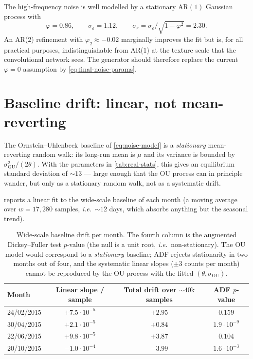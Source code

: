 The high-frequency noise is well modelled by a stationary
$\mathrm{AR}(1)$ Gaussian process with
\begin{equation}
    \varphi = 0.86, \qquad \sigma_\varepsilon = 1.12, \qquad
    \sigma_r = \sigma_\varepsilon / \sqrt{1 - \varphi^2} = 2.30.
    \label{eq:final-noise-params}
\end{equation}
An AR(2) refinement with $\varphi_2 \approx -0.02$ marginally improves
the fit but is, for all practical purposes, indistinguishable from
AR(1) at the texture scale that the convolutional network sees. The
generator should therefore replace the current $\varphi = 0$ assumption
by \cref{eq:final-noise-params}.

\section{Baseline drift: linear, not mean-reverting}
\label{sec:reanal-drift}

The Ornstein--Uhlenbeck baseline of \cref{eq:noise-model} is a
\emph{stationary} mean-reverting random walk: its long-run mean is
$\mu$ and its variance is bounded by
$\sigma_{\mathrm{OU}}^2 / (2\theta)$. With the parameters in
\cref{tab:real-stats}, this gives an equilibrium standard deviation
of $\sim 13$ --- large enough that the OU process can in principle
wander, but only as a stationary random walk, not as a systematic
drift.

 reports a linear fit to the wide-scale
baseline of each month (a moving average over $w = 17{,}280$ samples,
\emph{i.e.}\ $\sim 12$ days, which absorbs anything but the seasonal
trend).

\begin{table}[H]
    \centering
    \footnotesize
    \begin{tabular}{lccc}
        \toprule
        Month & Linear slope / sample & Total drift over $\sim 40\text{k}$ samples
              & ADF $p$-value \\
        \midrule
        24/02/2015 & $+7.5 \cdot 10^{-5}$ & $+2.95$ & $0.159$ \\
        30/04/2015 & $+2.1 \cdot 10^{-5}$ & $+0.84$ & $1.9 \cdot 10^{-9}$ \\
        22/06/2015 & $+9.8 \cdot 10^{-5}$ & $+3.87$ & $0.104$ \\
        20/10/2015 & $-1.0 \cdot 10^{-4}$ & $-3.99$ & $1.6 \cdot 10^{-3}$ \\
        \bottomrule
    \end{tabular}
    \caption{Wide-scale baseline drift per month. The fourth column is
    the augmented Dickey--Fuller test $p$-value (the null is a unit
    root, \emph{i.e.}\ non-stationary). The OU model would correspond
    to a \emph{stationary} baseline; ADF rejects stationarity in two
    months out of four, and the systematic linear slopes
    ($\pm 3$ counts per month) cannot be reproduced by the OU process
    with the fitted $(\theta, \sigma_{\mathrm{OU}})$.}
    \label{tab:reanal-drift}
\end{table}

